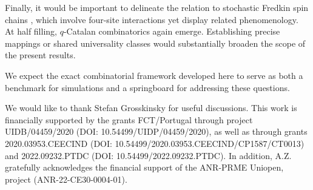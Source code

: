 \documentclass[pdflatex,sn-mathphys-num]{sn-jnl}
\theoremstyle{definition}
\theoremstyle{remark}
\numberwithin{equation}{section}
\begin{document}
Finally, it would be important to delineate the relation to stochastic Fredkin spin chains \cite{causer2022slow}, which involve four-site interactions yet display related phenomenology. At half filling, $q$-Catalan combinatorics again emerge. Establishing precise mappings or shared universality classes would substantially broaden the scope of the present results.

We expect the exact combinatorial framework developed here to serve as both a benchmark for simulations and a springboard for addressing these questions.

\backmatter
{}

We would like to thank Stefan Grosskinsky for useful discussions.
This work is financially supported by the grants
FCT/Portugal through project UIDB/04459/2020 (DOI: 10.54499/UIDP/04459/2020), as well as through grants 2020.03953.CEECIND (DOI: 10.54499/2020.03953.CEECIND/CP1587/CT0013) and 2022.09232.PTDC (DOI: 10.54499/2022.09232.PTDC).
In addition, A.Z. gratefully acknowledges the financial support of the ANR-PRME Uniopen, project (ANR-22-CE30-0004-01).
\end{document}
